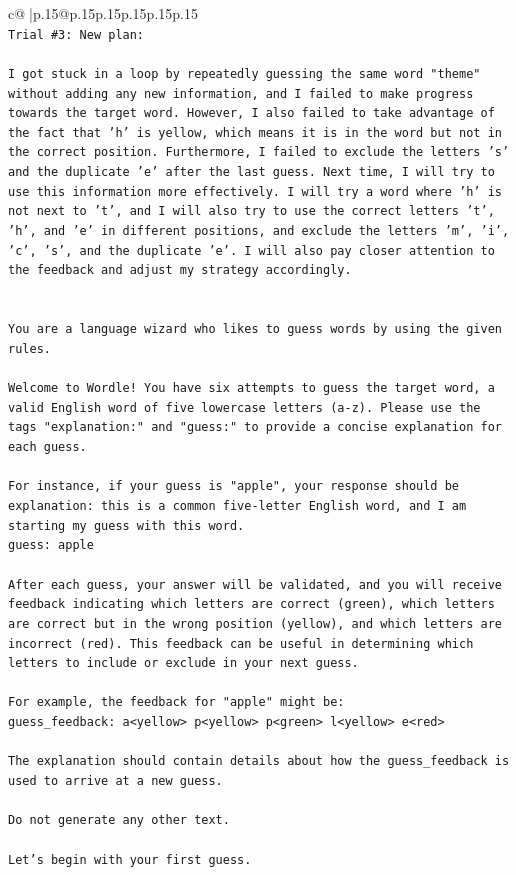 \documentclass{article}
\begin{document}
{\begin{supertabular}{c@{$\;$}|p{.15\linewidth}@{}p{.15\linewidth}p{.15\linewidth}p{.15\linewidth}p{.15\linewidth}p{.15\linewidth}}
{{{\\ 
\texttt{Trial \#3: New plan: } \\
\\ 
\texttt{I got stuck in a loop by repeatedly guessing the same word "theme" without adding any new information, and I failed to make progress towards the target word. However, I also failed to take advantage of the fact that 'h' is yellow, which means it is in the word but not in the correct position. Furthermore, I failed to exclude the letters 's' and the duplicate 'e' after the last guess. Next time, I will try to use this information more effectively. I will try a word where 'h' is not next to 't', and I will also try to use the correct letters 't', 'h', and 'e' in different positions, and exclude the letters 'm', 'i', 'c', 's', and the duplicate 'e'. I will also pay closer attention to the feedback and adjust my strategy accordingly.} \\
\\ 
\\ 
\texttt{You are a language wizard who likes to guess words by using the given rules.} \\
\\ 
\texttt{Welcome to Wordle! You have six attempts to guess the target word, a valid English word of five lowercase letters (a{-}z). Please use the tags "explanation:" and "guess:" to provide a concise explanation for each guess.} \\
\\ 
\texttt{For instance, if your guess is "apple", your response should be} \\
\texttt{explanation: this is a common five{-}letter English word, and I am starting my guess with this word.} \\
\texttt{guess: apple} \\
\\ 
\texttt{After each guess, your answer will be validated, and you will receive feedback indicating which letters are correct (green), which letters are correct but in the wrong position (yellow), and which letters are incorrect (red). This feedback can be useful in determining which letters to include or exclude in your next guess.} \\
\\ 
\texttt{For example, the feedback for "apple" might be:} \\
\texttt{guess\_feedback: a<yellow> p<yellow> p<green> l<yellow> e<red>} \\
\\ 
\texttt{The explanation should contain details about how the guess\_feedback is used to arrive at a new guess.} \\
\\ 
\texttt{Do not generate any other text.} \\
\\ 
\texttt{Let's begin with your first guess.} \\
            }
        }
    }
     \\ \\


\end{supertabular}}
\end{document}

